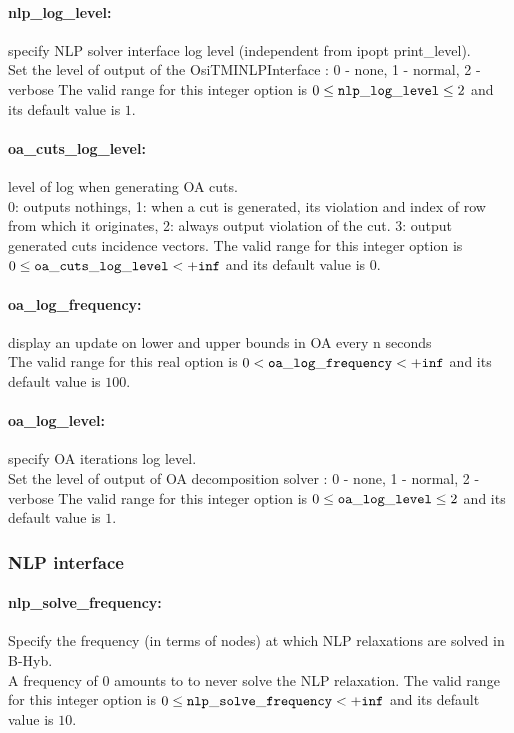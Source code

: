 \paragraph{nlp\_log\_level:} specify NLP solver interface log level (independent from ipopt print\_level). $\;$ \\
 Set the level of output of the OsiTMINLPInterface
: 0 - none, 1 - normal, 2 - verbose The valid range for this integer option is
$0 \le {\tt nlp\_log\_level } \le 2$
and its default value is $1$.

\paragraph{oa\_cuts\_log\_level:} level of log when generating OA cuts. $\;$ \\
 0: outputs nothings,
1: when a cut is generated,
its violation and index of row from which it
originates,
2: always output violation of the
cut.
3: output generated cuts incidence vectors. The valid range for this integer option is
$0 \le {\tt oa\_cuts\_log\_level } <  {\tt +inf}$
and its default value is $0$.

\paragraph{oa\_log\_frequency:} display an update on lower and upper bounds in OA every n seconds $\;$ \\
 The valid range for this real option is 
$0 <  {\tt oa\_log\_frequency } <  {\tt +inf}$
and its default value is $100$.


\paragraph{oa\_log\_level:} specify OA iterations log level. $\;$ \\
 Set the level of output of OA decomposition
solver : 0 - none, 1 - normal, 2 - verbose The valid range for this integer option is
$0 \le {\tt oa\_log\_level } \le 2$
and its default value is $1$.


\subsubsection{NLP interface}
\label{sec:bonmin_nlp_interface_option}
\label{sec:bonmin_options_:_Nlp_solve_options}

\paragraph{nlp\_solve\_frequency:} Specify the frequency (in terms of nodes) at which NLP relaxations are solved in B-Hyb. $\;$ \\
 A frequency of 0 amounts to to never solve the
NLP relaxation. The valid range for this integer option is
$0 \le {\tt nlp\_solve\_frequency } <  {\tt +inf}$
and its default value is $10$.


